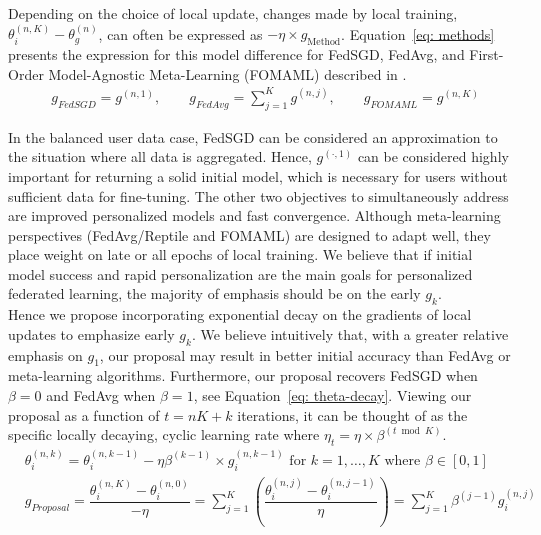 \documentclass{article}
\begin{document}
Depending on the choice of local update, changes made by local training, $\theta_i^{(n, K)} - \theta_g^{(n)}$, can often be expressed as $-\eta \times g_{\textrm{Method}}$.
Equation~\ref{eq: methods} presents the expression for this model difference for FedSGD, FedAvg, and First-Order Model-Agnostic Meta-Learning (FOMAML) described in \cite{maml}.
\begin{align}
    & g_{FedSGD} = g^{(n, 1)}, \qquad g_{FedAvg} = \sum_{j = 1}^K g^{(n, j)}, \qquad g_{FOMAML} = g^{(n, K)}  \label{eq: methods}
\end{align}

In the balanced user data case, FedSGD can be considered an approximation to the situation where all data is aggregated.
Hence, $g^{(\cdot, 1)}$ can be considered highly important for returning a solid initial model, which is necessary for users without sufficient data for fine-tuning.
The other two objectives to simultaneously address are improved personalized models and fast convergence.
Although meta-learning perspectives (FedAvg/Reptile and FOMAML) are designed to adapt well, they place weight on late or all epochs of local training.
We believe that if initial model success and rapid personalization are the main goals for personalized federated learning, the majority of emphasis should be on the early $g_k$. \\

Hence we propose incorporating exponential decay on the gradients of local updates to emphasize early $g_k$. 
We believe intuitively that, with a greater relative emphasis on $g_1$, our proposal may result in better initial accuracy than FedAvg or meta-learning algorithms. 
Furthermore, our proposal recovers FedSGD when $\beta = 0$ and FedAvg when $\beta = 1$, see Equation~\ref{eq: theta-decay}. 
Viewing our proposal as a function of $t = nK + k$ iterations, it can be thought of as the specific locally decaying, cyclic learning rate where $\eta_t = \eta \times \beta^{(t \bmod K)}$.
\begin{align}
    & \theta_i^{(n, k)} = \theta_i^{(n, k - 1)} - \eta \beta^{(k - 1)} \times g_i^{(n, k - 1)} \textrm{ for } k = 1, \ldots, K \textrm{ where } \beta \in \left[0, 1\right] \\
    & g_{Proposal} = \dfrac{\theta_i^{(n, K)} - \theta_i^{(n, 0)}}{-\eta} = \sum_{j = 1}^K \left( \dfrac{\theta_i^{(n, j)} - \theta_i^{(n, j - 1)}}{\eta} \right) = \sum_{j = 1}^K \beta^{(j - 1)} g_i^{(n, j)} \label{eq: theta-decay} 
\end{align}
\end{document}
